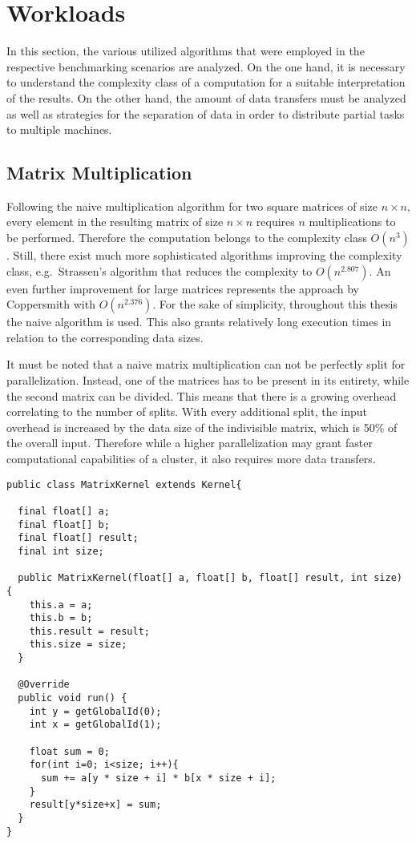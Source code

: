 \section{Workloads}
\label{workload_explanation}
In this section, the various utilized algorithms that were employed in the respective benchmarking scenarios are analyzed. On the one hand, it is necessary to understand the complexity class of a computation for a suitable interpretation of the results. On the other hand, the amount of data transfers must be analyzed as well as strategies for the separation of data in order to distribute partial tasks to multiple machines.

\subsection*{Matrix Multiplication}
\label{matrix_multiplication_workload}
Following the naive multiplication algorithm for two square matrices of size $n\times n$, every element in the resulting matrix of size $n\times n$ requires $n$ multiplications to be performed. Therefore the computation belongs to the complexity class $O(n^3)$. Still, there exist much more sophisticated algorithms improving the complexity class, e.g.~Strassen's algorithm that reduces the complexity to $O(n^{2.807})$\cite{strassen}. An even further improvement for large matrices represents the approach by Coppersmith with $O(n^{2.376})$\cite{coppersmith}. For the sake of simplicity, throughout this thesis the naive algorithm is used. This also grants relatively long execution times in relation to the corresponding data sizes.

It must be noted that a naive matrix multiplication can not be perfectly split for parallelization. Instead, one of the matrices has to be present in its entirety, while the second matrix can be divided. This means that there is a growing overhead correlating to the number of splits. With every additional split, the input overhead is increased by the data size of the indivisible matrix, which is 50\% of the overall input. Therefore while a higher parallelization may grant faster computational capabilities of a cluster, it also requires more data transfers.

\begin{lstlisting}[caption=Aparapi Matrix Multiplication,captionpos=b,label=lst:aparapi_matrix_multiplication]
public class MatrixKernel extends Kernel{

  final float[] a;
  final float[] b;
  final float[] result;
  final int size;

  public MatrixKernel(float[] a, float[] b, float[] result, int size) {
    this.a = a;
    this.b = b;
    this.result = result;
    this.size = size;
  }

  @Override
  public void run() {
    int y = getGlobalId(0);
    int x = getGlobalId(1);

    float sum = 0;
    for(int i=0; i<size; i++){
      sum += a[y * size + i] * b[x * size + i];
    }
    result[y*size+x] = sum;
  }
}
\end{lstlisting}

